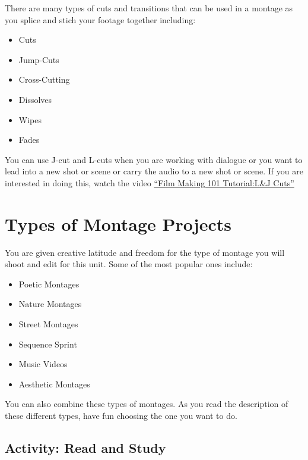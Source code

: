 \documentclass[
]{book}
\providecommand{\tightlist}{%
  \setlength{\itemsep}{0pt}\setlength{\parskip}{0pt}}
\begin{document}
There are many types of cuts and transitions that can be used in a montage as you splice and stich your footage together including:

\begin{itemize}
\tightlist
\item
  Cuts
\item
  Jump-Cuts
\item
  Cross-Cutting
\item
  Dissolves
\item
  Wipes
\item
  Fades
\end{itemize}

You can use J-cut and L-cuts when you are working with dialogue or you want to lead into a new shot or scene or carry the audio to a new shot or scene. If you are interested in doing this, watch the video \href{https://www.youtube.com/watch?v=PAvJevWUVsc}{``Film Making 101 Tutorial:L\&J Cuts''}

\hypertarget{types-of-montage-projects}{%
\section{Types of Montage Projects}\label{types-of-montage-projects}}

You are given creative latitude and freedom for the type of montage you will shoot and edit for this unit. Some of the most popular ones include:

\begin{itemize}
\tightlist
\item
  Poetic Montages
\item
  Nature Montages
\item
  Street Montages
\item
  Sequence Sprint
\item
  Music Videos
\item
  Aesthetic Montages
\end{itemize}

You can also combine these types of montages. As you read the description of these different types, have fun choosing the one you want to do.

\hypertarget{activity-read-and-study-2}{%
\subsection*{Activity: Read and Study}\label{activity-read-and-study-2}}
\end{document}
